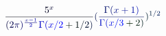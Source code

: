 \documentclass[12pt]{article}
\begin{document}
\makeatletter
\renewcommand*{\@textcolor}[3]{%
  \protect\leavevmode
  \begingroup
    \color#1{#2}#3%
  \endgroup
}
\makeatother
\begin{displaymath}
\mathcolor[RGB]{0,0,15}{\frac { \mathcolor[RGB]{0,0,30}{5} ^ { \mathcolor[RGB]{0,0,45}{x} } } { \mathcolor[RGB]{0,0,60}{(} \mathcolor[RGB]{0,0,75}{2} \mathcolor[RGB]{0,0,90}{\pi} \mathcolor[RGB]{0,0,105}{)} ^ { \mathcolor[RGB]{0,0,120}{\frac { \mathcolor[RGB]{0,0,135}{x} \mathcolor[RGB]{0,0,150}{-} \mathcolor[RGB]{0,0,165}{1} } { \mathcolor[RGB]{0,0,180}{2} } } } \mathcolor[RGB]{0,0,195}{\Gamma} \mathcolor[RGB]{0,0,210}{(} \mathcolor[RGB]{0,0,225}{x} \mathcolor[RGB]{0,0,240}{/} \mathcolor[RGB]{0,0,255}{2} \mathcolor[RGB]{0,15,0}{+} \mathcolor[RGB]{0,15,15}{1} \mathcolor[RGB]{0,15,30}{/} \mathcolor[RGB]{0,15,45}{2} \mathcolor[RGB]{0,15,60}{)} } } \mathcolor[RGB]{0,15,75}{(} \mathcolor[RGB]{0,15,90}{\frac { \mathcolor[RGB]{0,15,105}{\Gamma} \mathcolor[RGB]{0,15,120}{(} \mathcolor[RGB]{0,15,135}{x} \mathcolor[RGB]{0,15,150}{+} \mathcolor[RGB]{0,15,165}{1} \mathcolor[RGB]{0,15,180}{)} } { \mathcolor[RGB]{0,15,195}{\Gamma} \mathcolor[RGB]{0,15,210}{(} \mathcolor[RGB]{0,15,225}{x} \mathcolor[RGB]{0,15,240}{/} \mathcolor[RGB]{0,15,255}{3} \mathcolor[RGB]{0,30,0}{+} \mathcolor[RGB]{0,30,15}{2} \mathcolor[RGB]{0,30,30}{)} } } \mathcolor[RGB]{0,30,45}{)} ^ { \mathcolor[RGB]{0,30,60}{1} \mathcolor[RGB]{0,30,75}{/} \mathcolor[RGB]{0,30,90}{2} }
\end{displaymath}
\end{document}
